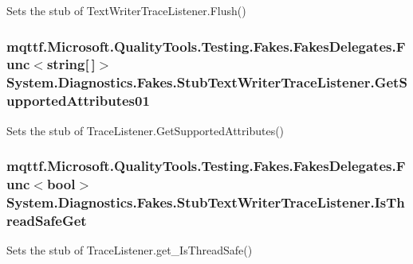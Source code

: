Sets the stub of Text\-Writer\-Trace\-Listener.\-Flush()

\hypertarget{class_system_1_1_diagnostics_1_1_fakes_1_1_stub_text_writer_trace_listener_aaeb3555a8f897d2f7e944cb183112574}{
\subsubsection[{Get\-Supported\-Attributes01}]{\setlength{\rightskip}{0pt plus 5cm}mqttf.\-Microsoft.\-Quality\-Tools.\-Testing.\-Fakes.\-Fakes\-Delegates.\-Func$<$string\mbox{[}$\,$\mbox{]}$>$ System.\-Diagnostics.\-Fakes.\-Stub\-Text\-Writer\-Trace\-Listener.\-Get\-Supported\-Attributes01}}\label{class_system_1_1_diagnostics_1_1_fakes_1_1_stub_text_writer_trace_listener_aaeb3555a8f897d2f7e944cb183112574}


Sets the stub of Trace\-Listener.\-Get\-Supported\-Attributes()

\hypertarget{class_system_1_1_diagnostics_1_1_fakes_1_1_stub_text_writer_trace_listener_aa380c91c47a13ffedf0cf12d36e9f828}{
\subsubsection[{Is\-Thread\-Safe\-Get}]{\setlength{\rightskip}{0pt plus 5cm}mqttf.\-Microsoft.\-Quality\-Tools.\-Testing.\-Fakes.\-Fakes\-Delegates.\-Func$<$bool$>$ System.\-Diagnostics.\-Fakes.\-Stub\-Text\-Writer\-Trace\-Listener.\-Is\-Thread\-Safe\-Get}}\label{class_system_1_1_diagnostics_1_1_fakes_1_1_stub_text_writer_trace_listener_aa380c91c47a13ffedf0cf12d36e9f828}


Sets the stub of Trace\-Listener.\-get\-\_\-\-Is\-Thread\-Safe()

